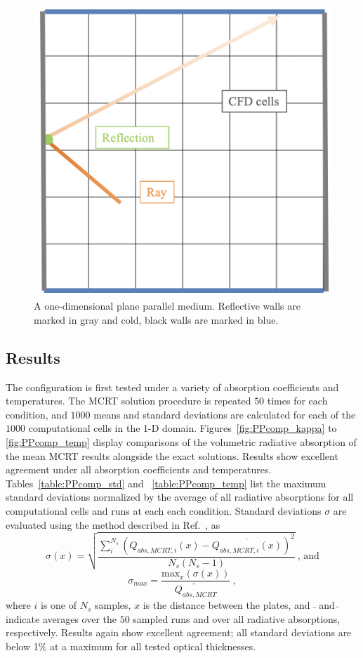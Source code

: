 \begin{figure}
\centering
\includegraphics[width=0.5\linewidth]{figures/ch4/PlaneParallel.png}
\caption{A one-dimensional plane parallel medium. Reflective walls are marked in gray and  cold, black walls are marked in blue.}
\label{fig:PlaneParallel2}
\end{figure}

\subsection{Results}
The configuration is first tested under a variety of absorption coefficients and temperatures.
The MCRT solution procedure is repeated $50$ times for each condition, and $1000$ means and standard deviations are calculated for each of the $1000$ computational cells in the 1-D domain.
Figures~\ref{fig:PPcomp_kappa} to \ref{fig:PPcomp_temp} display comparisons of the volumetric radiative absorption of the mean MCRT results alongside the exact solutions.
Results show excellent agreement under all absorption coefficients and temperatures. Tables~\ref{table:PPcomp_std} and ~\ref{table:PPcomp_temp} list the maximum standard deviations normalized by the average of all radiative absorptions for all computational cells and runs at each each condition. Standard deviations $\sigma$ are evaluated using the method described in Ref.~\cite{Modest2022ChapterExchange}, as 
\begin{equation}
    \sigma(x) = \sqrt{\frac{\sum_i^{N_s}{(Q_{abs,MCRT,i}(x)-\overline{Q_{abs,MCRT,i}(x)})^2}}{N_s(N_s-1)}}~\text{, and}
    \label{eq:StandardDeviation}
\end{equation}
\begin{equation}
    \sigma_{max} = \frac{\text{max}_x(\sigma(x))}{\widetilde{Q_{abs,MCRT}}}~,
    \label{eq:StandardDeviationMax}
\end{equation}
where $i$ is one of $N_s$ samples, $x$ is the distance between the plates, and $\bar{~}$ and $\widetilde{~}$ indicate averages over the $50$ sampled runs and over all radiative absorptions, respectively. Results again show excellent agreement; all standard deviations are below 1\% at a maximum for all tested optical thicknesses.


